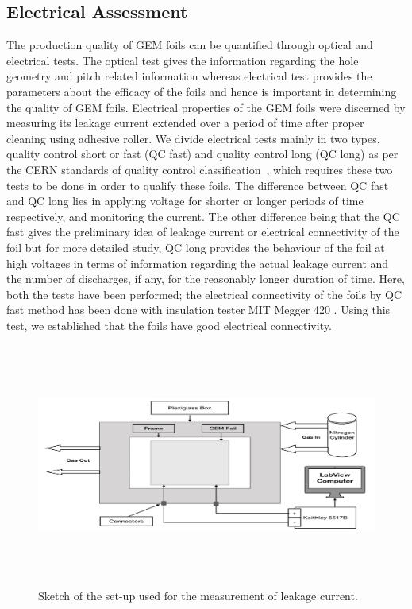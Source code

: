 \subsection{Electrical Assessment}
The production quality of GEM foils can be quantified through optical and electrical tests. The optical test gives the information regarding the hole geometry and pitch related information whereas electrical test provides the parameters about the efficacy of the foils and hence is important in determining the quality of GEM foils. 
Electrical properties of the GEM foils were discerned by measuring its leakage current extended over a period of time after proper cleaning using adhesive roller.\tabularnewline
We divide electrical tests mainly in two types, quality control short or fast (QC fast) and quality control long (QC long) as per the CERN standards of quality control classification~\cite{Abbaneo2015}, which requires these two tests to be done in order to qualify these foils. 
The difference between QC fast and QC long lies in applying voltage for shorter or longer periods of time respectively, and monitoring the current. 
The other difference being that the QC fast gives the preliminary idea of leakage current or electrical connectivity of the foil but for more detailed study, QC long provides the behaviour of the foil at high voltages in terms of information regarding the actual leakage current and the number of discharges, if any, for the reasonably longer duration of time. 
Here, both the tests have been performed; the electrical connectivity of the foils by QC fast method has been done with insulation tester MIT Megger 420 \cite{twelve}. Using this test, we established that the foils have good electrical connectivity.
\begin{figure}[!htbp]
    \centering
        \includegraphics[width=12cm,height=8cm]{figures/GEM/figures/10.jpeg}
   \caption{Sketch of the set-up used for the measurement of leakage current.} \label{fig:Cleaning_Measurement}
\end{figure}
